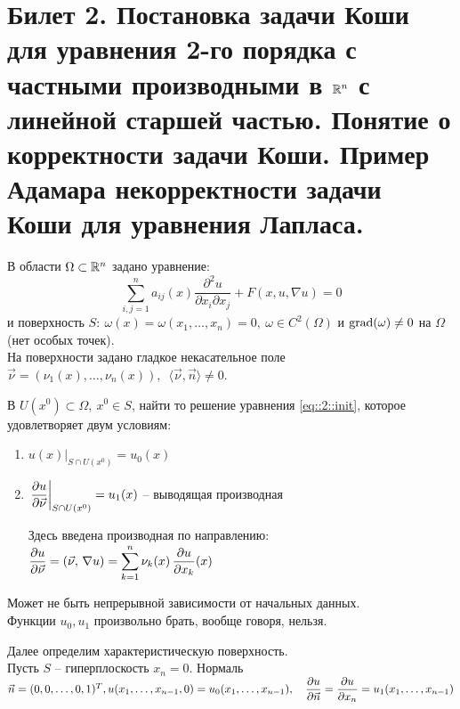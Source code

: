 \documentclass[../main.tex]{subfiles}
\begin{document}
\section{Билет 2. Постановка задачи Коши для уравнения 2-го порядка с частными производными в \texorpdfstring{$\mathbb{R}^n$}{R\textasciicircum n} с линейной старшей частью. Понятие о корректности задачи Коши. Пример Адамара некорректности задачи Коши для уравнения Лапласа.}
В области $\Omega \subset \mathbb{R}^n$ задано уравнение:
\begin{equation}
\label{eq::2::init}
\sum\limits_{i,j=1}^{n} a_{ij}(x)\frac{\partial^2u}{\partial x_i\partial x_j} + F(x, u, \nabla u) = 0
\end{equation}
и поверхность $S:\ \omega(x) = \omega(x_1, \dots, x_n) = 0,\ \omega \in C^2(\Omega)$ и $\operatorname{grad}(\omega) \not= 0$ на $\Omega$ (нет особых точек).\\
На поверхности задано гладкое некасательное поле $\vec{\nu} = (\nu_1(x), \dots, \nu_n(x)),\ \; \langle \vec{\nu}, \vec{n} \rangle \not= 0$.
\begin{definition}
В $U(x^0)\subset\Omega,\ x^0 \in S$, найти то решение уравнения \eqref{eq::2::init}, которое удовлетворяет двум условиям:
\begin{enumerate}
\item $u(x)|_{S\cap U(x^0)}=u_0(x)$
\item $\left. \dfrac{\partial u}{\partial \vec{\nu}}\right|_{S\cap U(x^0)} = u_1(x)$ -- выводящая производная

Здесь введена производная по направлению: $\dfrac{\partial u}{\partial \vec{\nu}} = \left(\vec{\nu},\, \nabla u\right) = \displaystyle\sum\limits_{k=1}^{n} \nu_k(x)\, \dfrac{\partial u}{\partial x_k}(x) $
\end{enumerate}
\end{definition}
Может не быть непрерывной зависимости от начальных данных.\\
Функции $u_0, u_1$ произвольно брать, вообще говоря, нельзя.


Далее определим характеристическую поверхность.\\
Пусть $S$ -- гиперплоскость $x_n = 0$. Нормаль $\vec{n} = (0,0,\dots,0, 1)^T,\\
u(x_1, \dots, x_{n-1}, 0) = u_0(x_1, \dots, x_{n-1}),\quad \dfrac{\partial u}{\partial\vec{n}} = \dfrac{\partial u}{\partial x_n} = u_1(x_1, \dots, x_{n-1}) $
\end{document}
